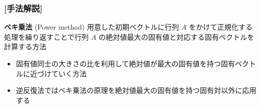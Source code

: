 \documentclass[dvipdfmx,aspectratio=169,20pt]{beamer}
\newcommand{\myfontsetting}[3]{{\fontsize{#1}{#2}\selectfont #3}}
\begin{document}
\begin{frame}
\frametitle{\large [手法解説]}

\begin{block}{\myfontsetting{20pt}{20pt}{\bf ベキ乗法} {\small(Power method)}}
\myfontsetting{15pt}{15pt}{
    用意した初期ベクトルに行列 $A$ をかけて正規化する処理を繰り返すことで行列 $A$ の絶対値最大の固有値と対応する固有ベクトルを計算する方法
}
\end{block}

\vspace{-2mm}

\begin{itemize}
    \item \myfontsetting{12pt}{12pt}{
    固有値同士の大きさの比を利用して絶対値が最大の固有値を持つ固有ベクトルに近づけていく方法
    }
    \item \myfontsetting{12pt}{12pt}{
    逆反復法ではベキ乗法の原理を絶対値最大の固有値を持つ固有対以外に応用する
    }
\end{itemize}
\end{frame}
\end{document}
